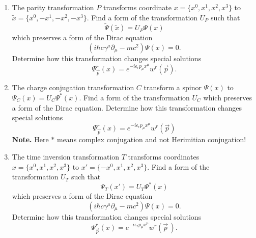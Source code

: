\documentclass[a4paper,11pt]{article}
\begin{document}
\begin{enumerate}
\item The parity transformation $P$ transforms coordinate
  $x = \{ x^{ 0 }, x^{ 1 }, x^{ 2 }, x^{ 3 } \}$ to
  $\widetilde{x} = \{ x^{ 0 }, -x^{ 1 }, -x^{ 2 }, -x^{ 3 } \}$. Find
  a form of the transformation $U_{ P }$ such that
  \begin{equation}
    \label{QM:10}
    \widetilde{\Psi}( \widetilde{x} ) = U_{ P } \Psi( x )
  \end{equation}
  which preserves a form of the Dirac equation
  \begin{equation}
    \label{QM:11}
    \left( i \hbar c \gamma^{ \mu } \partial_{ \mu } - m c^{ 2 } \right) \Psi( x ) = 0.
  \end{equation}
  Determine how this transformation changes special solutions
  \begin{equation}
    \label{QM:12}
    \Psi_{ \vec{ p } }^{ r }( x )
    = e^{ -i \epsilon_{ r } p_{ \mu } x^{ \mu } } w^{ r }( \vec{ p } ).
  \end{equation}



\item The charge conjugation transformation $C$ transform a spinor
  $\Psi( x )$ to $\Psi_{ C }( x ) = U_{ C } \Psi^{ * }( x )$. Find a
  form of the transformation $U_{ C }$ which preserves a form of the
  Dirac equation. Determine how this transformation changes special
  solutions
  \begin{equation}
    \label{QM:13}
    \Psi_{ \vec{ p } }^{ r }( x )
    = e^{ -i \epsilon_{ r } p_{ \mu } x^{ \mu } } w^{ r }( \vec{ p } )
  \end{equation}
  \textbf{Note.} Here $*$ means complex conjugation and not Herimitian
  conjugation!



\item The time inversion transformation $T$ transforms coordinates
  $x = \{ x^{ 0 }, x^{ 1 }, x^{ 2 }, x^{ 3 } \}$ to
  $x' = \{ -x^{ 0 }, x^{ 1 }, x^{ 2 }, x^{ 3 } \}$. Find a form of the
  transformation $U_{ T }$ such that
  \begin{equation}
    \label{QM:14}
    \Psi_{ T }( x' ) = U_{ T } \Psi^{ * }( x )
  \end{equation}
  which preserves a form of the Dirac equation
  \begin{equation}
    \label{QM:15}
    \left( i\hbar c \gamma^{ \mu } \partial_{ \mu } - m c^{ 2 } \right) \Psi( x ) = 0.
  \end{equation}
  Determine how this transformation changes special solutions
  \begin{equation}
    \label{QM:16}
    \Psi_{ \vec{ p } }^{ r }( x )
    = e^{ -i\epsilon_{ r } p_{ \mu } x^{ \mu } } w^{ r }( \vec{ p } \, ).
  \end{equation}




\end{enumerate}
\end{document}
